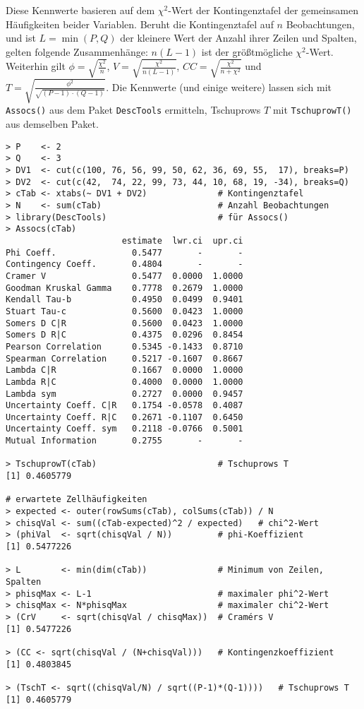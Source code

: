Diese Kennwerte basieren auf dem $\chi^{2}$-Wert der Kontingenztafel der gemeinsamen Häufigkeiten beider Variablen. Beruht die Kontingenztafel auf $n$ Beobachtungen, und ist $L = \min({P, Q})$ der kleinere Wert der Anzahl ihrer Zeilen und Spalten, gelten folgende Zusammenhänge: $n (L-1)$ ist der größtmögliche $\chi^{2}$-Wert. Weiterhin gilt $\phi = \sqrt{\frac{\chi^{2}}{n}}$, $V = \sqrt{\frac{\chi^{2}}{n (L-1)}}$, $CC = \sqrt{\frac{\chi^{2}}{n + \chi^{2}}}$ und $T = \sqrt{\frac{\phi^{2}}{\sqrt{(P-1) \cdot (Q-1)}}}$. Die Kennwerte (und einige weitere) lassen sich mit \lstinline!Assocs()! aus dem Paket \lstinline!DescTools! ermitteln, Tschuprows $T$ mit \lstinline!TschuprowT()! aus demselben Paket.
\begin{lstlisting}
> P    <- 2
> Q    <- 3
> DV1  <- cut(c(100, 76, 56, 99, 50, 62, 36, 69, 55,  17), breaks=P)
> DV2  <- cut(c(42,  74, 22, 99, 73, 44, 10, 68, 19, -34), breaks=Q)
> cTab <- xtabs(~ DV1 + DV2)              # Kontingenztafel
> N    <- sum(cTab)                       # Anzahl Beobachtungen
> library(DescTools)                      # für Assocs()
> Assocs(cTab)
                       estimate  lwr.ci  upr.ci
Phi Coeff.               0.5477       -       -
Contingency Coeff.       0.4804       -       -
Cramer V                 0.5477  0.0000  1.0000
Goodman Kruskal Gamma    0.7778  0.2679  1.0000
Kendall Tau-b            0.4950  0.0499  0.9401
Stuart Tau-c             0.5600  0.0423  1.0000
Somers D C|R             0.5600  0.0423  1.0000
Somers D R|C             0.4375  0.0296  0.8454
Pearson Correlation      0.5345 -0.1433  0.8710
Spearman Correlation     0.5217 -0.1607  0.8667
Lambda C|R               0.1667  0.0000  1.0000
Lambda R|C               0.4000  0.0000  1.0000
Lambda sym               0.2727  0.0000  0.9457
Uncertainty Coeff. C|R   0.1754 -0.0578  0.4087
Uncertainty Coeff. R|C   0.2671 -0.1107  0.6450
Uncertainty Coeff. sym   0.2118 -0.0766  0.5001
Mutual Information       0.2755       -       -

> TschuprowT(cTab)                        # Tschuprows T
[1] 0.4605779

# erwartete Zellhäufigkeiten
> expected <- outer(rowSums(cTab), colSums(cTab)) / N
> chisqVal <- sum((cTab-expected)^2 / expected)   # chi^2-Wert
> (phiVal  <- sqrt(chisqVal / N))         # phi-Koeffizient
[1] 0.5477226

> L        <- min(dim(cTab))              # Minimum von Zeilen, Spalten
> phisqMax <- L-1                         # maximaler phi^2-Wert
> chisqMax <- N*phisqMax                  # maximaler chi^2-Wert
> (CrV     <- sqrt(chisqVal / chisqMax))  # Cramérs V
[1] 0.5477226

> (CC <- sqrt(chisqVal / (N+chisqVal)))   # Kontingenzkoeffizient
[1] 0.4803845

> (TschT <- sqrt((chisqVal/N) / sqrt((P-1)*(Q-1))))   # Tschuprows T
[1] 0.4605779
\end{lstlisting}

